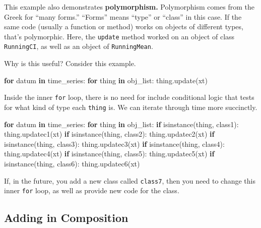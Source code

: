 \documentclass[
  12pt,
  krantz2]{krantz}
\makeatletter
\newenvironment{Shaded}{\begin{snugshade}}{\end{snugshade}}
\newcommand{\BuiltInTok}[1]{#1}
\newcommand{\ControlFlowTok}[1]{\textcolor[rgb]{0.27,0.27,0.27}{\textbf{#1}}}
\newcommand{\KeywordTok}[1]{\textcolor[rgb]{0.27,0.27,0.27}{\textbf{#1}}}
\newcommand{\NormalTok}[1]{#1}
\newenvironment{kframe}{%
\medskip{}
\setlength{\fboxsep}{.8em}
 \def\at@end@of@kframe{}%
 \ifinner\ifhmode%
  \def\at@end@of@kframe{\end{minipage}}%
  \begin{minipage}{\columnwidth}%
 \fi\fi%
 \def\FrameCommand##1{\hskip\@totalleftmargin \hskip-\fboxsep
 \colorbox{shadecolor}{##1}\hskip-\fboxsep
     \hskip-\linewidth \hskip-\@totalleftmargin \hskip\columnwidth}%
 \MakeFramed {\advance\hsize-\width
   \@totalleftmargin\z@ \linewidth\hsize
   \@setminipage}}%
 {\par\unskip\endMakeFramed%
 \at@end@of@kframe}
\renewenvironment{Shaded}{\begin{kframe}}{\end{kframe}}
\makeatother
\begin{document}
This example also demonstrates \textbf{polymorphism.} Polymorphism comes from the Greek for ``many forms.'' ``Forms'' means ``type'' or ``class'' in this case. If the same code (usually a function or method) works on objects of different types, that's polymorphic. Here, the \texttt{update} method worked on an object of class \texttt{RunningCI}, as well as an object of \texttt{RunningMean}.

Why is this useful? Consider this example.

\begin{Shaded}
\begin{Highlighting}[]
\ControlFlowTok{for}\NormalTok{ datum }\KeywordTok{in}\NormalTok{ time\_series:}
    \ControlFlowTok{for}\NormalTok{ thing }\KeywordTok{in}\NormalTok{ obj\_list:}
\NormalTok{        thing.update(xt)}
\end{Highlighting}
\end{Shaded}

Inside the inner \texttt{for} loop, there is no need for include conditional logic that tests for what kind of type each \texttt{thing} is. We can iterate through time more succinctly.

\begin{Shaded}
\begin{Highlighting}[]
\ControlFlowTok{for}\NormalTok{ datum }\KeywordTok{in}\NormalTok{ time\_series:}
    \ControlFlowTok{for}\NormalTok{ thing }\KeywordTok{in}\NormalTok{ obj\_list:}
        \ControlFlowTok{if} \BuiltInTok{isinstance}\NormalTok{(thing, class1):}
\NormalTok{            thing.updatec1(xt)}
        \ControlFlowTok{if} \BuiltInTok{isinstance}\NormalTok{(thing, class2):}
\NormalTok{            thing.updatec2(xt)}
        \ControlFlowTok{if} \BuiltInTok{isinstance}\NormalTok{(thing, class3):}
\NormalTok{            thing.updatec3(xt)}
        \ControlFlowTok{if} \BuiltInTok{isinstance}\NormalTok{(thing, class4):}
\NormalTok{            thing.updatec4(xt)}
        \ControlFlowTok{if} \BuiltInTok{isinstance}\NormalTok{(thing, class5):}
\NormalTok{            thing.updatec5(xt)}
        \ControlFlowTok{if} \BuiltInTok{isinstance}\NormalTok{(thing, class6):}
\NormalTok{            thing.updatec6(xt)}
\end{Highlighting}
\end{Shaded}

If, in the future, you add a new class called \texttt{class7}, then you need to change this inner \texttt{for} loop, as well as provide new code for the class.

\hypertarget{adding-in-composition}{%
\subsection{Adding in Composition}\label{adding-in-composition}}
\end{document}
